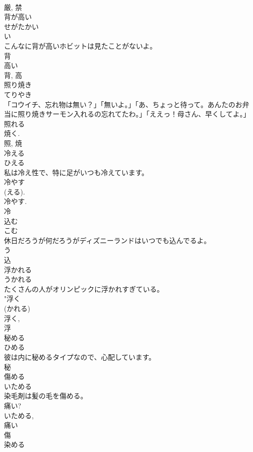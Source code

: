 \documentclass[8pt]{extreport}
\begin{document}
\begin{CJK}{UTF8}{min}
\\	厳, 禁	
\\	背が高い	
\\	せがたかい	
\\	い 
\\	こんなに背が高いホビットは見たことがないよ。	
\\	背 
\\	高い 
\\	背, 高	
\\	照り焼き	
\\	てりやき	
\\	「コウイチ、忘れ物は無い？」「無いよ。」「あ、ちょっと待って。あんたのお弁当に照り焼きサーモン入れるの忘れてたわ。」「ええっ！母さん、早くしてよ。」	
\\	照れる 
\\	焼く. 
\\	照, 焼	
\\	冷える	
\\	ひえる	
\\	私は冷え性で、特に足がいつも冷えています。	
\\	冷やす 
\\	(える). 
\\	冷やす. 
\\	冷	
\\	込む	
\\	こむ	
\\	休日だろうが何だろうがディズニーランドはいつでも込んでるよ。	
\\	う 
\\	込	
\\	浮かれる	
\\	うかれる	
\\	たくさんの人がオリンピックに浮かれすぎている。	
\\	"浮く 
\\	(かれる) 
\\	浮く, 
\\	浮	
\\	秘める	
\\	ひめる	
\\	彼は内に秘めるタイプなので、心配しています。	
\\	秘	
\\	傷める	
\\	いためる	
\\	染毛剤は髪の毛を傷める。	
\\	痛い? 
\\	いためる, 
\\	痛い
\\	傷	
\\	染める	

\end{CJK}
\end{document}
